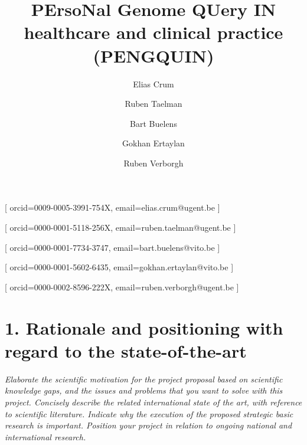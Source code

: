 \documentclass{article}
\begin{document}
\title{PErsoNal Genome QUery IN healthcare and clinical practice (PENGQUIN)}
\author[1,2]{Elias Crum}[
orcid=0009-0005-3991-754X,
email=elias.crum@ugent.be
]
\cormark[1]

\author[1]{Ruben Taelman}[
orcid=0000-0001-5118-256X,
email=ruben.taelman@ugent.be
]

\author[2]{Bart Buelens}[
orcid=0000-0001-7734-3747,
email=bart.buelens@vito.be
]

\author[2]{Gokhan Ertaylan}[
orcid=0000-0001-5602-6435,
email=gokhan.ertaylan@vito.be
]

\author[1]{Ruben Verborgh}[
orcid=0000-0002-8596-222X,
email=ruben.verborgh@ugent.be
]

\address [1] {IDLab, Department of Electronics and Information Systems, Ghent University -- imec, Belgium}
\address [2] {Flemish institute for Technological Research (VITO) Mol, Belgium}


\maketitle


\section{1. Rationale and positioning with regard to the state-of-the-art}
\textit{Elaborate the scientific motivation for the project proposal based on scientific knowledge gaps, and the issues and problems that you want to solve with this project. Concisely describe the related international state of the art, with reference to scientific literature. Indicate why the execution of the proposed strategic basic research is important. Position your project in relation to ongoing national and international research.} 
\end{document}

